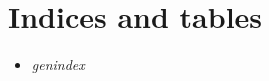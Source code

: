 \documentclass[letterpaper,10pt,english]{sphinxmanual}
\begin{document}
\chapter{Indices and tables}
\label{index:indices-and-tables}\begin{itemize}
\item {} 
\emph{genindex}

\end{itemize}



\renewcommand{\indexname}{Index}
\printindex
\end{document}
